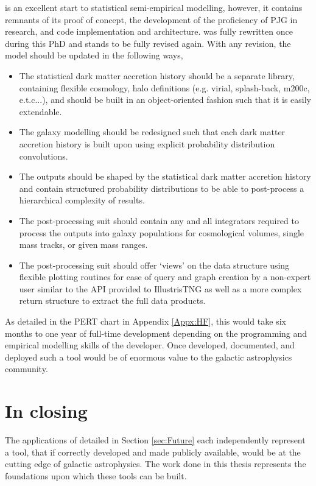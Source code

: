 \steel is an excellent start to statistical semi-empirical modelling, however, it contains remnants of its proof of concept, the development of the proficiency of PJG in research, and code implementation and architecture. \steel was fully rewritten once during this PhD and stands to be fully revised again. With any revision, the model should be updated in the following ways,

\begin{itemize}
    \item The statistical dark matter accretion history should be a separate library, containing flexible cosmology, halo definitions (e.g. virial, splash-back, m200c, e.t.c...), and should be built in an object-oriented fashion such that it is easily extendable.
    \item The galaxy modelling should be redesigned such that each dark matter accretion history is built upon using explicit probability distribution convolutions.
    \item The outputs should be shaped by the statistical dark matter accretion history and contain structured probability distributions to be able to post-process a hierarchical complexity of results.
    \item The post-processing suit should contain any and all integrators required to process the outputs into galaxy populations for cosmological volumes, single mass tracks, or given mass ranges.
    \item The post-processing suit should offer `views' on the data structure using flexible plotting routines for ease of query and graph creation by a non-expert user similar to the API provided to IllustrisTNG \cite[][https://www.tng-project.org/data/vis/]{Nelson2019TheRelease} as well as a more complex return structure to extract the full data products.
\end{itemize}

As detailed in the PERT chart in Appendix \ref{Appx:HF}, this would take six months to one year of full-time development depending on the programming and empirical modelling skills of the developer. Once developed, documented, and deployed such a tool would be of enormous value to the galactic astrophysics community. 

\section{In closing}

The applications of \steel detailed in Section \ref{sec:Future} each independently represent a tool, that if correctly developed and made publicly available, would be at the cutting edge of galactic astrophysics. The work done in this thesis represents the foundations upon which these tools can be built. 

